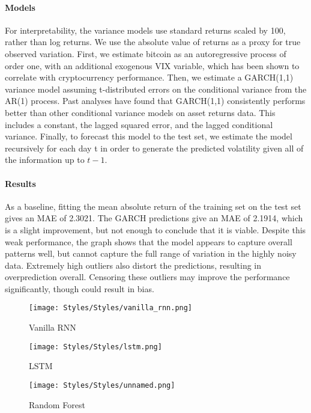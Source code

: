 \documentclass{article}
\begin{document}
\paragraph{Models}
For interpretability, the variance models use standard returns scaled by 100, rather than log returns. We use the absolute value of returns as a proxy for true observed variation. First, we estimate bitcoin as an autoregressive process of order one, with an additional exogenous VIX variable, which has been shown to correlate with cryptocurrency performance. Then, we estimate a GARCH(1,1) variance model assuming t-distributed errors on the conditional variance from the AR(1) process. Past analyses have found that GARCH(1,1) consistently performs better than other conditional variance models on asset returns data. This includes a constant, the lagged squared error, and the lagged conditional variance. Finally, to forecast this model to the test set, we estimate the model recursively for each day t in order to generate the predicted volatility given all of the information up to $t-1$.
\paragraph{Results}
As a baseline, fitting the mean absolute return of the training set on the test set gives an MAE of 2.3021. The GARCH predictions give an MAE of 2.1914, which is a slight improvement, but not enough to conclude that it is viable. Despite this weak performance, the graph shows that the model appears to capture overall patterns well, but cannot capture the full range of variation in the highly noisy data. Extremely high outliers also distort the predictions, resulting in overprediction overall. Censoring these outliers may improve the performance significantly, though could result in bias.


\begin{figure} [H]
    \centering
    \texttt{[image: Styles/Styles/vanilla\_rnn.png]}
    \caption{Vanilla RNN}
    \label{fig:enter-label}
\end{figure}

\begin{figure}
    \centering
    \texttt{[image: Styles/Styles/lstm.png]}
    \caption{LSTM}
    \label{fig:enter-label}
\end{figure}

\begin{figure} 
    \centering
    \texttt{[image: Styles/Styles/unnamed.png]}
    \caption{Random Forest}
    \label{fig:enter-label}
\end{figure}
\end{document}
